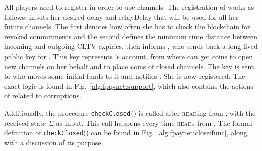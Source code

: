   All players need to register in order to use channels. The registration of
  \alice{} works as follows: \alice{} inputs her desired delay and relayDelay
  that will be used for all her future channels. The first denotes how often she
  has to check the blockchain for revoked commitments and the second defines the
  minimum time distance between incoming and outgoing CLTV expiries. \fpaynet{}
  then informs \simulator{}, who sends back a long-lived public key for \alice.
  This key represents \alice's account, from where \fpaynet{} can get coins to
  open new channels on her behalf and to place coins of closed channels. The key
  is sent to \alice{} who moves some initial funds to it and notifies
  \fpaynet{}. She is now registered. The exact logic is found in
  Fig.~\ref{alg:fpaynet:support}, which also contains the actions of \fpaynet{}
  related to corruptions.

  Additionally, the procedure \texttt{checkClosed}() is called after
  \textsc{read}ing from \ledger, with the received state $\Sigma$ as input. This
  call happens every time \fpaynet{} \textsc{read}s from \ledger. The formal
  definition of \texttt{checkClosed}() can be found in
  Fig.~\ref{alg:fpaynet:close:func}, along with a discussion of its purpose.

